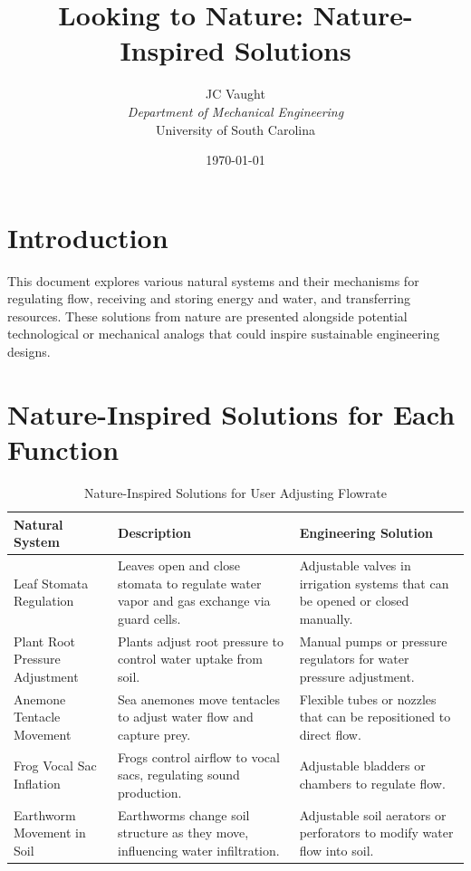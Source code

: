 \documentclass[12pt]{article}
\title{Looking to Nature: Nature-Inspired Solutions}
\author{
    JC Vaught \\
    \textit{Department of Mechanical Engineering} \\
    University of South Carolina
}
\date{\today}
\begin{document}
\maketitle

\section*{Introduction}
This document explores various natural systems and their mechanisms for regulating flow, receiving and storing energy and water, and transferring resources. These solutions from nature are presented alongside potential technological or mechanical analogs that could inspire sustainable engineering designs. 

\section*{Nature-Inspired Solutions for Each Function}
\begin{table}[h!]
    \centering
    \caption{Nature-Inspired Solutions for User Adjusting Flowrate}
    \begin{tabular}{p{4cm} p{5.5cm} p{5.5cm}}
        \toprule
        \textbf{Natural System} & \textbf{Description} & \textbf{Engineering Solution} \\
        \midrule
        Leaf Stomata Regulation & Leaves open and close stomata to regulate water vapor and gas exchange via guard cells. & Adjustable valves in irrigation systems that can be opened or closed manually. \\
        Plant Root Pressure Adjustment & Plants adjust root pressure to control water uptake from soil. & Manual pumps or pressure regulators for water pressure adjustment. \\
        Anemone Tentacle Movement & Sea anemones move tentacles to adjust water flow and capture prey. & Flexible tubes or nozzles that can be repositioned to direct flow. \\
        Frog Vocal Sac Inflation & Frogs control airflow to vocal sacs, regulating sound production. & Adjustable bladders or chambers to regulate flow. \\
        Earthworm Movement in Soil & Earthworms change soil structure as they move, influencing water infiltration. & Adjustable soil aerators or perforators to modify water flow into soil. \\
        \bottomrule
    \end{tabular}
    \label{tab:user_adjusting_flowrate}
\end{table}
\end{document}
